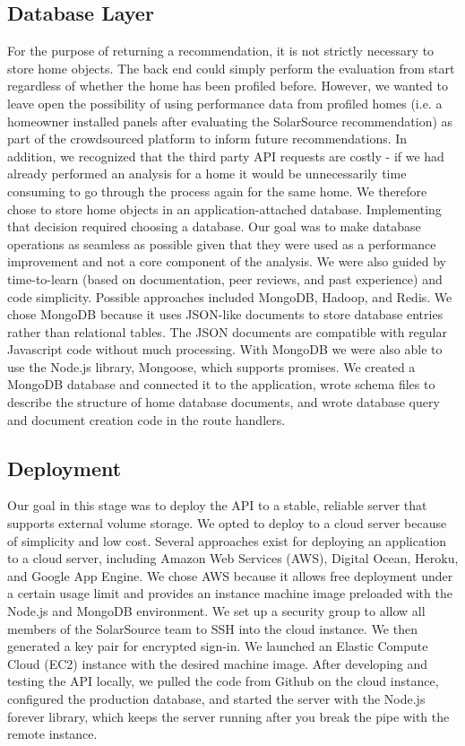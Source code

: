 \documentclass[pageno]{jpaper}
\begin{document}
\subsection{Database Layer}
For the purpose of returning a recommendation, it is not strictly necessary to store home objects. The back end could simply perform the evaluation from start regardless of whether the home has been profiled before. However, we wanted to leave open the possibility of using performance data from profiled homes (i.e. a homeowner installed panels after evaluating the SolarSource recommendation) as part of the crowdsourced platform to inform future recommendations. In addition, we recognized that the third party API requests are costly - if we had already performed an analysis for a home it would be unnecessarily time consuming to go through the process again for the same home. We therefore chose to store home objects in an application-attached database. Implementing that decision required choosing a database. Our goal was to make database operations as seamless as possible given that they were used as a performance improvement and not a core component of the analysis. We were also guided by time-to-learn (based on documentation, peer reviews, and past experience) and code simplicity. Possible approaches included MongoDB, Hadoop, and Redis. We chose MongoDB because it uses JSON-like documents to store database entries rather than relational tables. The JSON documents are compatible with regular Javascript code without much processing. With MongoDB we were also able to use the Node.js library, Mongoose, which supports promises. We created a MongoDB database and connected it to the application, wrote schema files to describe the structure of home database documents, and wrote database query and document creation code in the route handlers.

\subsection{Deployment}
Our goal in this stage was to deploy the API to a stable, reliable server that supports external volume storage. We opted to deploy to a cloud server because of simplicity and low cost. Several approaches exist for deploying an application to a cloud server, including Amazon Web Services (AWS), Digital Ocean, Heroku, and Google App Engine. We chose AWS because it allows free deployment under a certain usage limit and provides an instance machine image preloaded with the Node.js and MongoDB environment. We set up a security group to allow all members of the SolarSource team to SSH into the cloud instance. We then generated a key pair for encrypted sign-in. We launched an Elastic Compute Cloud (EC2) instance with the desired machine image. After developing and testing the API locally, we pulled the code from Github on the cloud instance, configured the production database, and started the server with the Node.js forever library, which keeps the server running after you break the pipe with the remote instance.
\end{document}
